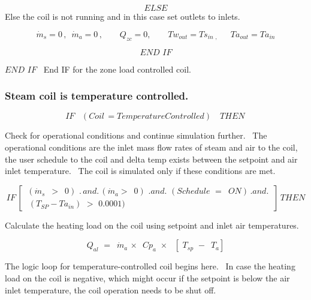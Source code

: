 \[ELSE\] Else the coil is not running and in this case set outlets to inlets.

\begin{equation}
{\dot m_s} = 0\,,\,\,\,{\dot m_a} = 0\,,\,\,\,\,\,\,\,\,\,\,\,\,{Q_{zc}} = 0,\,\,\,\,\,\,\,\,\,\,\,\,T{w_{out}} = T{s_{in\,\,,\,\,\,\,}}\,\,\,\,\,\,T{a_{out}} = T{a_{in}}
\end{equation}

\begin{equation}
END\,\,IF
\end{equation}

\(END\,\,IF\) ~End IF for the zone load controlled coil.

\subsubsection{Steam coil is temperature controlled.}\label{steam-coil-is-temperature-controlled.}

\begin{equation}
IF\,\,\,\,\,(Coil\, = TemperatureControlled)\,\,\,\,\,\,THEN\,
\end{equation}

Check for operational conditions and continue simulation further.~ The operational conditions are the inlet mass flow rates of steam and air to the coil, the user schedule to the coil and delta temp exists between the setpoint and air inlet temperature.~ The coil is simulated only if these conditions are met.

\begin{equation}
IF\,\left[ \begin{array}{l}\,({{\dot m}_s}\,\,\, > \,\,\,0)\,\,.\,and.\,({{\dot m}_a} > \,\,\,0)\,\,.and.\,\,(Schedule\,\, = \,\,\,ON)\,.and.\,\\\,\,({T_{SP}} - T{a_{in}})\,\, > \,\,0.0001)\,\end{array} \right]\,THEN
\end{equation}

Calculate the heating load on the coil using setpoint and inlet air temperatures.

\begin{equation}
{Q_{al}}\,\, = \,\,\,{\dot m_a}\, \times \,\,\,C{p_a}\,\, \times \,\,\,\,[\,\,{T_{sp}}\,\, - \,\,\,{T_a}]
\end{equation}

The logic loop for temperature-controlled coil begins here.~ In case the heating load on the coil is negative, which might occur if the setpoint is below the air inlet temperature, the coil operation needs to be shut off.

